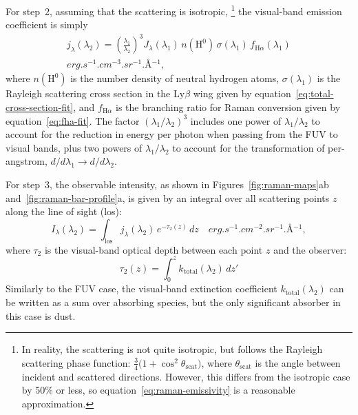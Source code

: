 \documentclass[useAMS, usenatbib, a4paper]{mnras}
\newcommand*\chem[1]{\ensuremath{\mathrm{#1}}}
\newcommand\ha{\ensuremath{\text{H}\alpha}}
\newcommand\lyb{\ensuremath{\text{Ly}\beta}}
\begin{document}
For step~2, assuming that the scattering is isotropic,%
\footnote{
  In reality, the scattering is not quite isotropic,
  but follows the Rayleigh scattering phase function:
  \(\frac34 \bigl( 1 + \cos^2\theta_{\text{scat}} \bigr)\),
  where \(\theta_{\text{scat}}\) is the angle between
  incident and scattered directions.
  However, this differs from the isotropic case by 50\% or less,
  so equation~\eqref{eq:raman-emissivity} is a reasonable approximation.
}
the visual-band emission coefficient is simply
\begin{multline}
  \label{eq:raman-emissivity}
  j_\lambda (\lambda_2) = \left(  \frac{\lambda_1}{\lambda_2}\right)^3
  J_\lambda(\lambda_1) \, n(\chem{H^0}) \, \sigma(\lambda_1) \, f_{\ha}(\lambda_1) 
  \\ \si{erg.s^{-1}.cm^{-3}.sr^{-1}.\angstrom^{-1}} ,
\end{multline}
where \(n(\chem{H^0})\) is the number density of neutral hydrogen atoms,
\(\sigma(\lambda_1)\) is the Rayleigh scattering cross section
in the \lyb{} wing given by
equation~\eqref{eq:total-cross-section-fit},
and \(f_{\ha}\) is the branching ratio for Raman conversion given by
equation~\eqref{eq:fha-fit}.
The factor \((\lambda_1 / \lambda_2)^3\) includes one power of \(\lambda_1/\lambda_2\)
to account for the reduction in energy per photon when passing from
the FUV to visual bands,
plus two powers of \(\lambda_1/\lambda_2\) to account for the transformation of
per-angstrom, \(d/d\lambda_1 \to d/d\lambda_2\).

For step~3, the observable intensity,
as shown in Figures~\ref{fig:raman-maps}ab and~\ref{fig:raman-bar-profile}a,
is given by an integral over all scattering points \(z\) along the line of sight (los):
\begin{equation}
  \label{eq:formal-solution}
  I_\lambda (\lambda_2) = \int_{\text{los}} j_\lambda(\lambda_2) \, e^{-\tau_2(z)} \, dz
  \quad \si{erg.s^{-1}.cm^{-2}.sr^{-1}.\angstrom^{-1}} ,
\end{equation}
where \(\tau_2\) is the visual-band optical depth between each point \(z\)
and the observer:
\begin{equation}
  \label{eq:tau-visual}
  \tau_2(z) = \int_0^z k_{\text{total}} (\lambda_2) \, dz'
\end{equation}
Similarly to the FUV case,
the visual-band extinction coefficient \( k_{\text{total}} (\lambda_2)\)
can be written as a sum over absorbing species,
but the only significant absorber in this case is dust.
\end{document}
